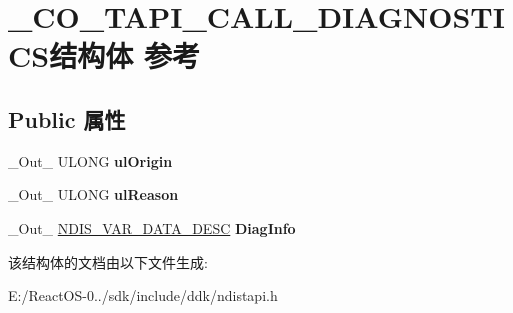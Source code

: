 \hypertarget{struct___c_o___t_a_p_i___c_a_l_l___d_i_a_g_n_o_s_t_i_c_s}{}\section{\+\_\+\+C\+O\+\_\+\+T\+A\+P\+I\+\_\+\+C\+A\+L\+L\+\_\+\+D\+I\+A\+G\+N\+O\+S\+T\+I\+C\+S结构体 参考}
\label{struct___c_o___t_a_p_i___c_a_l_l___d_i_a_g_n_o_s_t_i_c_s}
\subsection*{Public 属性}
\begin{DoxyCompactItemize}
\item 
\mbox{\label{struct___c_o___t_a_p_i___c_a_l_l___d_i_a_g_n_o_s_t_i_c_s_a30e2908cbf660c087dd48868ddace7c2}} 
\+\_\+\+Out\+\_\+ U\+L\+O\+NG {\bfseries ul\+Origin}
\item 
\mbox{\label{struct___c_o___t_a_p_i___c_a_l_l___d_i_a_g_n_o_s_t_i_c_s_a493a3993a50627000be23e3320fd0b47}} 
\+\_\+\+Out\+\_\+ U\+L\+O\+NG {\bfseries ul\+Reason}
\item 
\mbox{\label{struct___c_o___t_a_p_i___c_a_l_l___d_i_a_g_n_o_s_t_i_c_s_a69cb526464812533514fac8d59ee0f6b}} 
\+\_\+\+Out\+\_\+ \hyperlink{struct___n_d_i_s___v_a_r___d_a_t_a___d_e_s_c}{N\+D\+I\+S\+\_\+\+V\+A\+R\+\_\+\+D\+A\+T\+A\+\_\+\+D\+E\+SC} {\bfseries Diag\+Info}
\end{DoxyCompactItemize}


该结构体的文档由以下文件生成\+:\begin{DoxyCompactItemize}
\item 
E\+:/\+React\+O\+S-\/0../sdk/include/ddk/ndistapi.\+h\end{DoxyCompactItemize}
